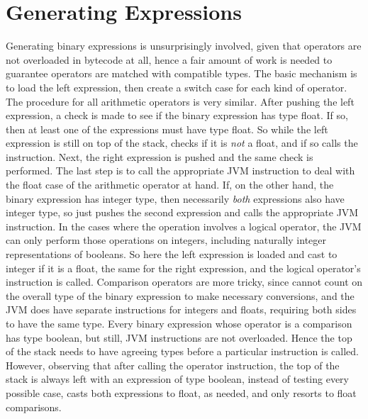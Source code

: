 \section{Generating Expressions}

Generating binary expressions is unsurprisingly involved, given that operators are not overloaded in bytecode at all, hence a fair amount of work is needed to guarantee operators are matched with compatible types. The basic mechanism is to load the left expression, then create a switch case for each kind of operator. The procedure for all arithmetic operators is very similar. After pushing the left expression, a check is made to see if the binary expression has type float. If so, then at least one of the expressions must have type float. So while the left expression is still on top of the stack,  checks if it is \emph{not} a float, and if so calls the  instruction. Next, the right expression is pushed and the same check is performed. The last step is to call the appropriate JVM instruction to deal with the float case of the arithmetic operator at hand. If, on the other hand, the binary expression has integer type, then necessarily \emph{both} expressions also have integer type, so  just pushes the second expression and calls the appropriate JVM instruction. In the cases where the operation involves a logical operator, the JVM can only perform those operations on integers, including naturally integer representations of booleans. So here the left expression is loaded and cast to integer if it is a float, the same for the right expression, and the logical operator's instruction is called. Comparison operators are more tricky, since  cannot count on the overall type of the binary expression to make necessary conversions, and the JVM does have separate instructions for integers and floats, requiring both sides to have the same type. Every binary expression whose operator is a comparison has type boolean, but still, JVM instructions are not overloaded. Hence the top of the stack needs to have agreeing types before a particular instruction is called. However, observing that after calling the operator instruction, the top of the stack is always left with an expression of type boolean, instead of testing every possible case,  casts both expressions to float, as needed, and only resorts to float comparisons.

